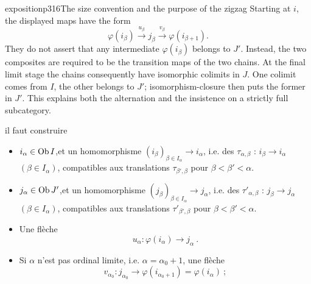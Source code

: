\begin{dcomment}{exposition}{p316}{The size convention and the purpose of the zigzag}
Starting at $i$, the displayed maps have the form
\[
 \varphi(i_\beta)\xrightarrow{u_\beta}j_\beta
 \xrightarrow{v_\beta}\varphi(i_{\beta+1}).
\]
They do not assert that any intermediate $\varphi(i_\beta)$ belongs to $J'$. Instead, the two composites are required to be the transition maps of the two chains. At the final limit stage the chains consequently have isomorphic colimits in $J$. One colimit comes from $I$, the other belongs to $J'$; isomorphism-closure then puts the former in $J'$. This explains both the alternation and the insistence on a strictly full subcategory.
\end{dcomment}


il faut construire

\begin{itemize}[leftmargin=*]
\item[1)] $i_\alpha\in\operatorname{Ob} I$,\quad et un homomorphisme $(i_\beta)_{\beta\in I_\alpha}\longrightarrow i_\alpha$, i.e. des $\tau_{\alpha,\beta}$ : $i_\beta\longrightarrow i_\alpha$ $(\beta\in I_\alpha)$, compatibles aux translations $\tau_{\beta',\beta}$ pour $\beta<\beta'<\alpha$.
\item[2)] $j_\alpha\in\operatorname{Ob} J'$,\quad et un homomorphisme $(j_\beta)_{\beta\in I_\alpha}\longrightarrow j_\alpha$, i.e. des $\tau'_{\alpha,\beta}$ : $j_\beta\longrightarrow j_\alpha$ $(\beta\in I_\alpha)$, compatibles aux translations $\tau'_{\beta',\beta}$ pour $\beta<\beta'<\alpha$.
\item[3)] Une flèche
\[
u_\alpha:\varphi(i_\alpha)\longrightarrow j_\alpha\ .
\]
\item[4)] Si $\alpha$ n'est pas ordinal limite, i.e. $\alpha=\alpha_0+1$, une flèche
\[
v_{\alpha_0}:j_{\alpha_0}\longrightarrow\varphi(i_{\alpha_0+1})=\varphi(i_\alpha)\ ;
\]
\end{itemize}

